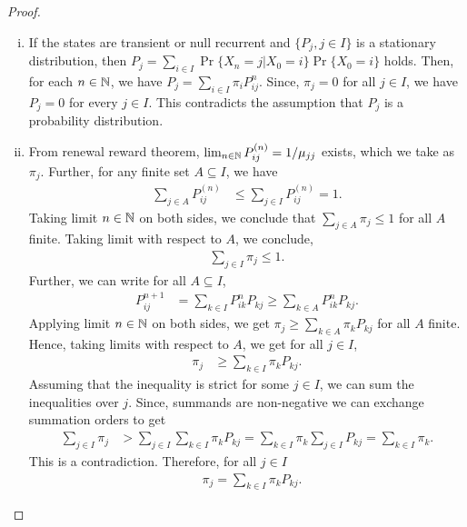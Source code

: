 \documentclass[a4paper,10pt,english]{article}
\begin{document}
\begin{proof}
\begin{enumerate}[i)]
\item 
If the states are transient or null recurrent and $\{P_j,j \in I\}$ is a stationary distribution, 
then $P_j = \sum_{i \in I} \Pr\{X_n = j|X_0 = i\} \Pr\{X_0 = i\}$ holds. 
Then, for each $n \in \mathbb{N}$, we have $P_j= \sum_{i \in I} \pi_i P_{ij}^n$. 
Since, $\pi_j = 0$ for all $j \in I$, we have $P_j=0$ for every $j \in I$. 
This contradicts the assumption that $P_j$ is a probability distribution. 
\item 
From renewal reward theorem, $\lim_{n \in \mathbb{N}}P_{ij}^{(n)} = 1/\mu_{jj}$ exists, which we take as $\pi_j$. Further, for any finite set $A \subseteq I$, we have
\begin{align*}
\sum_{j \in A} P_{ij}^{(n)}&\leq \sum_{j \in I} P_{ij}^{(n)} = 1.
\end{align*}
Taking limit $n \in \mathbb{N}$ on both sides, we conclude that $\sum_{j \in A}\pi_j  \leq 1$ for all $A$ finite. Taking limit with respect to $A$, we conclude,  
\begin{align*}
\sum_{j \in I} \pi_j \leq 1.
\end{align*}
Further, we can write for all $A \subseteq I$,
\begin{align*}
P_{ij}^{n+1} &= \sum_{k \in I}P_{ik}^nP_{kj} \geq \sum_{k \in A}P_{ik}^nP_{kj}.
\end{align*}
Applying limit $n \in \mathbb{N}$ on both sides, %
we get $\pi_j \geq \sum_{k \in A} \pi_kP_{kj}$ for all $A$ finite. 
Hence, taking limits with respect to $A$, we get for all $j \in I$,
\begin{align*}
\pi_j &\geq \sum_{k\in I} \pi_kP_{kj}.
\end{align*}	
Assuming that the inequality is strict for some $j \in I$, we can sum the inequalities over $j$. 
Since, summands are non-negative we can exchange summation orders to get
\begin{align*}
\sum_{j \in I} \pi_j &> \sum_{j \in I} \sum_{k \in I}\pi_kP_{kj} = \sum_{k \in I} \pi_k \sum_{j \in I} P_{kj} = \sum_{k \in I} \pi_k.
\end{align*}	
This is a contradiction. Therefore, for all $j \in I$
\begin{align*}
&\pi_j = \sum_{k \in I} \pi_k P_{kj}.
\end{align*}

\end{enumerate}
\end{proof}
\end{document}
